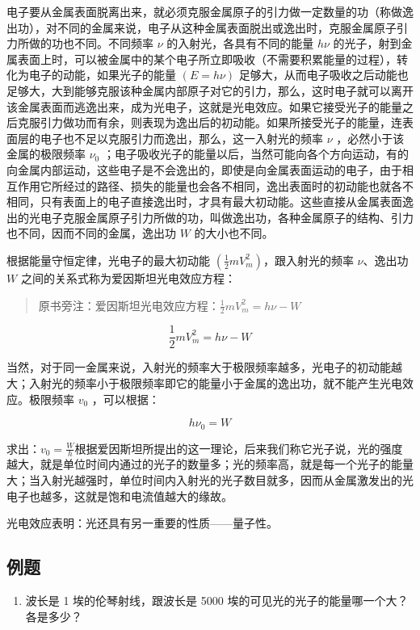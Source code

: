 电子要从金属表面脱离出来，就必须克服金属原子的引力做一定数量的功（称做逸出功），对不同的金属来说，电子从这种金属表面脱出或逸出时，克服金属原子引力所做的功也不同。不同频率
\(\nu\) 的入射光，各具有不同的能量 \(h\nu\)
的光子，射到金属表面上时，可以被金属中的某个电子所立即吸收（不需要积累能量的过程），转化为电子的动能，如果光子的能量
\((E = h\nu)\)
足够大，从而电子吸收之后动能也足够大，大到能够克服该种金属内部原子对它的引力，那么，这时电子就可以离开该金属表面而逃逸出来，成为光电子，这就是光电效应。如果它接受光子的能量之后克服引力做功而有余，则表现为逸出后的初动能。如果所接受光子的能量，连表面层的电子也不足以克服引力而逸出，那么，这一入射光的频率
\(\nu\) ，必然小于该金属的极限频率 \(\nu_0\)
；电子吸收光子的能量以后，当然可能向各个方向运动，有的向金属内部运动，这些电子是不会逸出的，即使是向金属表面运动的电子，由于相互作用它所经过的路径、损失的能量也会各不相同，逸出表面时的初动能也就各不相同，只有表面上的电子直接逸出时，才具有最大初动能。这些直接从金属表面逸出的光电子克服金属原子引力所做的功，叫做逸出功，各种金属原子的结构、引力也不同，因而不同的金属，逸出功
\(W\) 的大小也不同。

根据能量守恒定律，光电子的最大初动能
\(\left(\frac{1}{2} m V_{m}^{2}\right)\)，跟入射光的频率 \(\nu\)、逸出功
\(W\) 之间的关系式称为爱因斯坦光电效应方程：

\begin{quote}
原书旁注：爱因斯坦光电效应方程：\(\frac{1}{2} m V_{m}^{2} = h\nu - W\)
\end{quote}

\[
\frac {1}{2} m V _ {m} ^ {2} = h \nu - W
\]

当然，对于同一金属来说，入射光的频率大于极限频率越多，光电子的初动能越大；入射光的频率小于极限频率即它的能量小于金属的逸出功，就不能产生光电效应。极限频率
\(v_{0}\) ，可以根据：

\[
h \nu_ {0} = W
\]

求出：\(v_{0} = \frac{W}{h}\)根据爱因斯坦所提出的这一理论，后来我们称它光子说，光的强度越大，就是单位时间内通过的光子的数量多；光的频率高，就是每一个光子的能量大；当入射光越强时，单位时间内入射光的光子数目就多，因而从金属激发出的光电子也越多，这就是饱和电流值越大的缘故。

光电效应表明：光还具有另一重要的性质------量子性。

\subsection{例题}

\begin{enumerate}
\item
  波长是 1 埃的伦琴射线，跟波长是 5000
  埃的可见光的光子的能量哪一个大？各是多少？
\end{enumerate}

